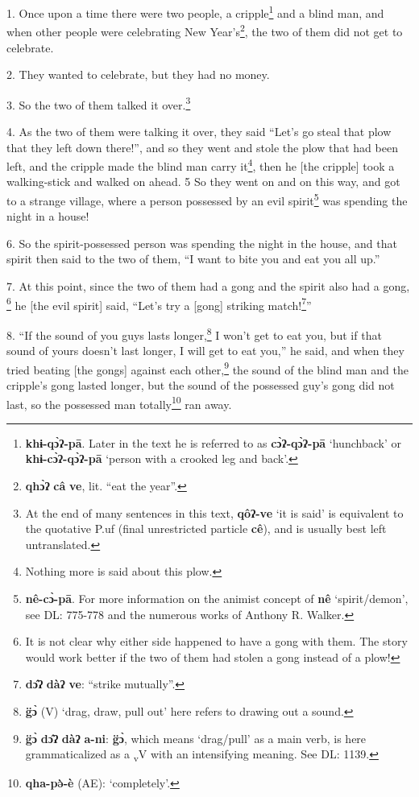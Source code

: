 \setcounter{footnote}{0}

1. Once upon a time there were two people, a cripple\footnote{\textbf{khɨ-qɔ̀ʔ-pā}. Later in the text he is referred to as \textbf{cɔ̀ʔ-qɔ̀ʔ-pā} `hunchback' or \textbf{khɨ-cɔ̀ʔ-qɔ̀ʔ-pā} `person with a crooked leg and back'.} and a blind man, and when
other people were celebrating New Year's\footnote{\textbf{qhɔ̀ʔ} \textbf{câ} \textbf{ve}, lit. ``eat the year''.}, the two of them did not get to celebrate.

2. They wanted to celebrate, but they had no money.

3. So the two of them talked it over.\footnote{At the end of many sentences in this text, \textbf{qôʔ-ve} `it is said' is equivalent to the quotative P.uf (final unrestricted particle \textbf{cê}), and is usually best left untranslated.}

4. As the two of them were talking it over, they said ``Let's go steal that plow
that they left down there!'', and so they went and stole the plow that had been
left, and the cripple made the blind man carry it\footnote{Nothing more is said about this plow.}, then he [the cripple] took
a walking-stick and walked on ahead. 5 So they went on and on this way, and got
to a strange village, where a person possessed by an evil spirit\footnote{\textbf{nê-cɔ̀-pā}. For more information on the animist concept of \textbf{nê} `spirit/demon', see DL: 775-778 and the numerous works of Anthony R. Walker.} was spending
the night in a house!

6. So the spirit-possessed person was spending the night in the house, and that
spirit then said to the two of them, ``I want to bite you and eat you all up.''

7. At this point, since the two of them had a gong and the spirit also had a gong,
\footnote{It is not clear why either side happened to have a gong with them. The story would work better if the two of them had stolen a gong instead of a plow!} he [the evil spirit] said, ``Let's try a [gong] striking match!\footnote{\textbf{dɔ̂ʔ} \textbf{dàʔ} \textbf{ve}: ``strike mutually''.}''

8. ``If the sound of you guys lasts longer,\footnote{\textbf{g̈ɔ̀} (V) `drag, draw, pull out' here refers to drawing out a sound.} I won't get to eat you,
but if that sound of yours doesn't last longer, I will get to eat you,'' he said,
and when they tried beating [the gongs] against each other,\footnote{\textbf{g̈ɔ̀} \textbf{dɔ̂ʔ} \textbf{dàʔ} \textbf{a-ni}: \textbf{g̈ɔ̀}, which means `drag/pull' as a main verb, is here grammaticalized as a \textsubscript{v}V with an intensifying meaning. See DL: 1139.} the sound of the
blind man and the cripple's gong lasted longer, but the sound of the possessed
guy's gong did not last, so the possessed man totally\footnote{\textbf{qha-pə̀-è} (AE): `completely'.} ran away.

